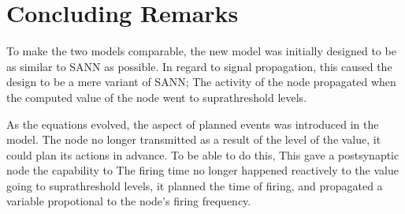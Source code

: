 %
%
%












\section{Concluding Remarks}

To make the two models comparable, the new model was initially designed to be as similar to SANN as possible.
In regard to signal propagation, this caused the design to be a mere variant of SANN;
	The activity of the node propagated when the computed value of the node went to suprathreshold levels.

As the equations evolved, the aspect of planned events was introduced in the model.
The node no longer transmitted as a result of the level of the value, it could plan its actions in advance.
To be able to do this, 
This gave a postsynaptic node the capability to 
The firing time no longer happened reactively to the value going to suprathreshold levels, it planned the time of firing, and propagated a variable propotional to the node's firing frequency.

